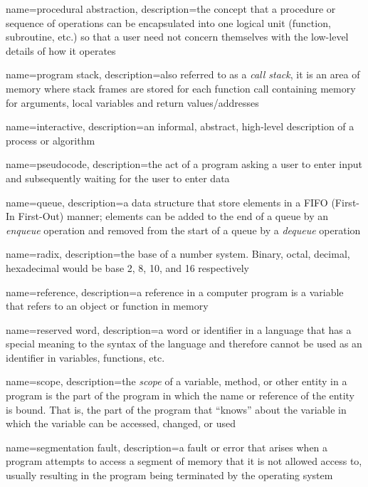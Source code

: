 {
  name=procedural abstraction,
  description={the concept that a procedure or sequence of operations can be encapsulated into one logical unit (function, subroutine, etc.) so that a user need not concern themselves with the low-level details of how it operates}
}

{
  name=program stack,
  description={also referred to as a \emph{call stack}, it is an area of memory where stack frames are stored for each function call containing memory for arguments, local variables and return values/addresses}
}

{
  name=interactive,
  description={an informal, abstract, high-level description of a process or algorithm}
}

{
  name=pseudocode,
  description={the act of a program asking a user to enter input and subsequently waiting for the user to enter data}
}

{
  name=queue,
  description={a data structure that store elements in a FIFO (First-In First-Out) manner; elements can be added to the end of a queue by an \emph{enqueue} operation and removed from the start of a queue by a \emph{dequeue} operation}
}

{
  name=radix,
  description={the base of a number system.  Binary, octal, decimal, hexadecimal would be base 2, 8, 10, and 16 respectively}
}

{
  name=reference,
  description={a reference in a computer program is a variable that refers to an object or function in memory}
}

{
  name=reserved word,
  description={a word or identifier in a language that has a special meaning to the syntax of the language and 
  	therefore cannot be used as an identifier in variables, functions, etc.}
}

{
  name=scope,
  description={the \emph{scope} of a variable, method, or other entity in a program
  	is the part of the program in which the name or reference of the entity is bound.
	That is, the part of the program that ``knows'' about the variable in which the variable
	can be accessed, changed, or used}
}

{
  name=segmentation fault,
  description={a fault or error that arises when a program attempts to access a segment of memory that it is not allowed access to, usually resulting in the program being terminated by the operating system}
}

